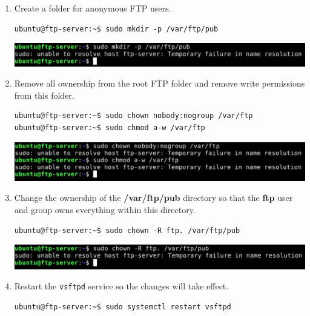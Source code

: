 \documentclass[letterpaper, 12pt]{article}
\begin{document}
\begin{enumerate}
    \item Create a folder for anonymous FTP users.
\begin{lstlisting}
ubuntu@ftp-server:~$ sudo mkdir -p /var/ftp/pub
\end{lstlisting}

    \begin{center}
        \includegraphics[width=\linewidth]{images/part1/step44.png}
    \end{center}

    \item Remove all ownership from the root FTP folder and remove write permissions from this folder.
\begin{lstlisting}
ubuntu@ftp-server:~$ sudo chown nobody:nogroup /var/ftp
ubuntu@ftp-server:~$ sudo chmod a-w /var/ftp
\end{lstlisting}

    \begin{center}
        \includegraphics[width=\linewidth]{images/part1/step45.png}
    \end{center}

    \item Change the ownership of the \textbf{/var/ftp/pub} directory so that the \textbf{ftp} user and group owns
    everything within this directory.
\begin{lstlisting}
ubuntu@ftp-server:~$ sudo chown -R ftp. /var/ftp/pub
\end{lstlisting}

    \begin{center}
        \includegraphics[width=\linewidth]{images/part1/step46.png}
    \end{center}

    \item Restart the \texttt{vsftpd} service so the changes will take effect.
\begin{lstlisting}
ubuntu@ftp-server:~$ sudo systemctl restart vsftpd
\end{lstlisting}


\end{enumerate}
\end{document}
